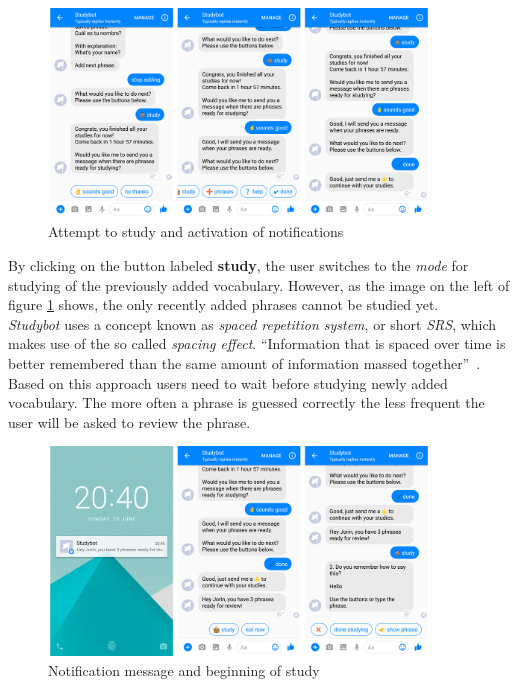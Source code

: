 \begin{figure}[h]
  \centering
  \includegraphics[width=0.9\textwidth]{images/interface/06-enable-notify.png}
	\caption{Attempt to study and activation of notifications}
	\label{fig:06-enable-notify}
\end{figure}

By clicking on the button labeled \textbf{study},
the user switches to the \emph{mode} for studying of the previously added vocabulary.
However, as the image on the left of figure \ref{fig:06-enable-notify} shows,
the only recently added phrases cannot be studied yet.
\\

\emph{Studybot} uses a concept known as \emph{spaced repetition system}, or short \emph{SRS},
which makes use of the so called \emph{spacing effect}. ``Information that is spaced over time is better remembered than the same amount of information massed together''~\cite{srs}.
Based on this approach users need to wait before studying newly added vocabulary.
The more often a phrase is guessed correctly the less frequent the user will be asked to review the phrase.
\\

\begin{figure}[h]
  \centering
  \includegraphics[width=0.9\textwidth]{images/interface/07-notify-study.png}
	\caption{Notification message and beginning of study}
	\label{fig:07-notify-study}
\end{figure}

